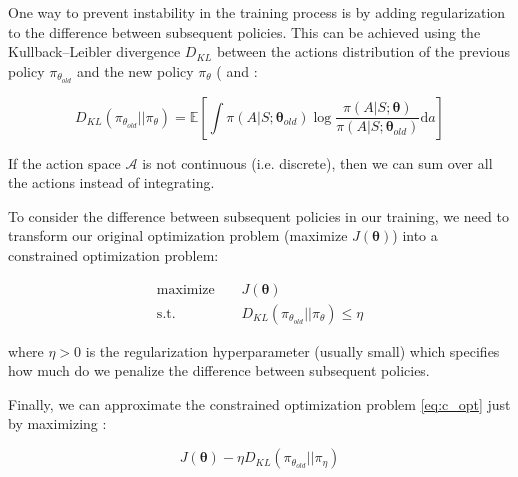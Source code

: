\documentclass[twoside,twocolumn]{article}
\begin{document}
One way to prevent instability in the training process is by adding regularization to the difference between subsequent policies. This can be achieved using the Kullback–Leibler divergence $D_{KL}$ between the actions distribution of the previous policy $\pi_{\theta_{old}}$ and the new policy $\pi_{\theta}$ (\cite{intro2RL} and \cite{Aclecture}:

\begin{equation*}
    D_{KL}(\pi_{\theta_{old}} || \pi_{\theta}) = \mathbb{E} \left[
    \int \pi(A|S;\boldsymbol{\theta}_{old})
    \log{\frac{\pi(A|S;\boldsymbol{\theta})}{\pi(A|S;\boldsymbol{\theta}_{old})}}\text{d}a
    \right]
\end{equation*}

\noindent If the action space $\mathcal{A}$ is not continuous (i.e. discrete), then we can sum over all the actions instead of integrating.

To consider the difference between subsequent policies in our training, we need to transform our original optimization problem (maximize $J(\boldsymbol{\theta})$) into a constrained optimization problem:

\begin{equation}
  \begin{split}
    \text{maximize} \ \ \ \ \ &J(\boldsymbol{\theta})\\
    \text{s.t.} \ \ \ \ \ &D_{KL}(\pi_{\theta_{old}} || \pi_{\theta}) \leq \eta
  \end{split}
  \label{eq:c_opt}
\end{equation}

\noindent where $\eta > 0$ is the regularization hyperparameter (usually small) which specifies how much do we penalize the difference between subsequent policies.

Finally, we can approximate the constrained optimization problem \ref{eq:c_opt} just by maximizing \cite{Vitay}:

\begin{equation}
  J(\boldsymbol{\theta}) - \eta D_{KL}(\pi_{\theta_{old}} || \pi_{\eta})
\end{equation}



\printbibliography

\end{document}
